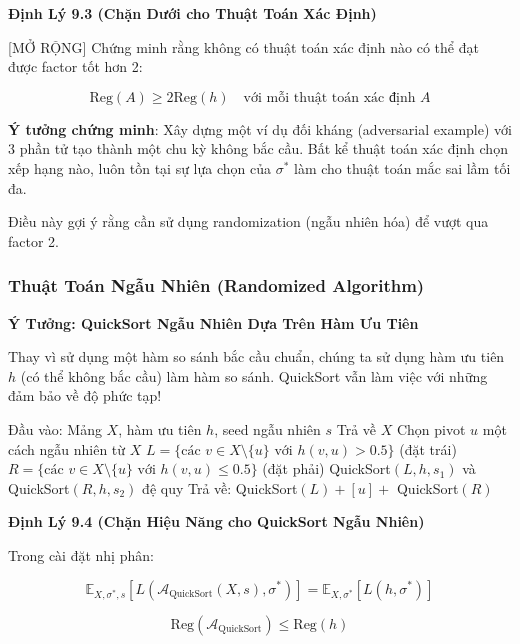 \textbf{Định Lý 9.3 (Chặn Dưới cho Thuật Toán Xác Định)}

[MỞ RỘNG] Chứng minh rằng không có thuật toán xác định nào có thể đạt được factor tốt hơn 2:

\begin{equation}
\text{Reg}(A) \geq 2 \text{Reg}(h) \quad \text{với mỗi thuật toán xác định } A
\end{equation}

\textbf{Ý tưởng chứng minh}: Xây dựng một ví dụ đối kháng (adversarial example) với 3 phần tử tạo thành một chu kỳ không bắc cầu. Bất kể thuật toán xác định chọn xếp hạng nào, luôn tồn tại sự lựa chọn của $\sigma^*$ làm cho thuật toán mắc sai lầm tối đa.

Điều này gợi ý rằng cần sử dụng randomization (ngẫu nhiên hóa) để vượt qua factor 2.

\subsubsection{Thuật Toán Ngẫu Nhiên (Randomized Algorithm)}

\textbf{Ý Tưởng: QuickSort Ngẫu Nhiên Dựa Trên Hàm Ưu Tiên}

Thay vì sử dụng một hàm so sánh bắc cầu chuẩn, chúng ta sử dụng hàm ưu tiên $h$ (có thể không bắc cầu) làm hàm so sánh. QuickSort vẫn làm việc với những đảm bảo về độ phức tạp!

\begin{algorithmic}
\State Đầu vào: Mảng $X$, hàm ưu tiên $h$, seed ngẫu nhiên $s$
    \State Trả về $X$
\EndIf
\State Chọn pivot $u$ một cách ngẫu nhiên từ $X$
\State $L = \{\text{các } v \in X \setminus \{u\} \text{ với } h(v,u) > 0.5\}$ (đặt trái)
\State $R = \{\text{các } v \in X \setminus \{u\} \text{ với } h(v,u) \leq 0.5\}$ (đặt phải)
\State QuickSort$(L, h, s_1)$ và QuickSort$(R, h, s_2)$ đệ quy
\State Trả về: QuickSort$(L) + [u] + $ QuickSort$(R)$
\end{algorithmic}

\textbf{Định Lý 9.4 (Chặn Hiệu Năng cho QuickSort Ngẫu Nhiên)}

Trong cài đặt nhị phân:

\begin{equation}
\mathbb{E}_{X,\sigma^*,s}[L(\mathcal{A}_{\text{QuickSort}}(X, s), \sigma^*)] = \mathbb{E}_{X,\sigma^*}[L(h, \sigma^*)]
\end{equation}

\begin{equation}
\text{Reg}(\mathcal{A}_{\text{QuickSort}}) \leq \text{Reg}(h)
\end{equation}

